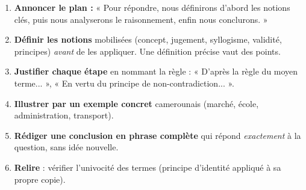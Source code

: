 \documentclass[11pt]{article}
\begin{document}
\begin{methode}
\begin{enumerate}
\item \textbf{Annoncer le plan :} « Pour répondre, nous définirons d'abord les notions clés, puis nous analyserons le raisonnement, enfin nous conclurons. »
\item \textbf{Définir les notions} mobilisées (concept, jugement, syllogisme, validité, principes) \emph{avant} de les appliquer. Une définition précise vaut des points.
\item \textbf{Justifier chaque étape} en nommant la règle : « D'après la règle du moyen terme... », « En vertu du principe de non-contradiction... ».
\item \textbf{Illustrer par un exemple concret} camerounais (marché, école, administration, transport).
\item \textbf{Rédiger une conclusion en phrase complète} qui répond \emph{exactement} à la question, sans idée nouvelle.
\item \textbf{Relire} : vérifier l'univocité des termes (principe d'identité appliqué à sa propre copie).
\end{enumerate}
\end{methode}
\end{document}
